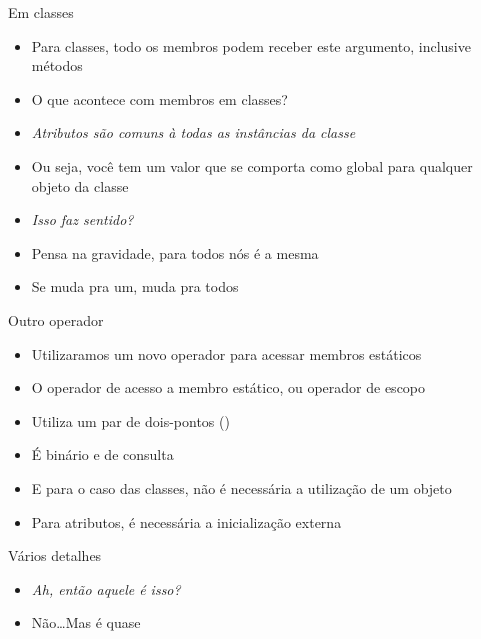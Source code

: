 \documentclass[14pt]{beamer}
\begin{document}
		\begin{frame}{Em classes}
			\begin{itemize}
				\presentationPause\item Para classes, todo os membros podem receber este argumento, inclusive métodos
				\presentationPause\item O que acontece com membros  em classes?
				\presentationPause\item \textit{Atributos são comuns à todas as instâncias da classe}
				\presentationPause\item Ou seja, você tem um valor que se comporta como global para qualquer objeto da classe
				\presentationPause\item \textit{Isso faz sentido?}
				\presentationPause\item Pensa na gravidade, para todos nós é a mesma
				\presentationPause\item Se muda pra um, muda pra todos
			\end{itemize}
		\end{frame}

		\begin{frame}{Outro operador}
			\begin{itemize}
				\presentationPause\item Utilizaramos um novo operador para acessar membros estáticos
				\presentationPause\item O operador de acesso a membro estático\presentationPause, ou operador de escopo
				\presentationPause\item Utiliza um par de dois-pontos (\basicCode{::})
				\presentationPause\item É binário e de consulta
			\end{itemize}
			\presentationPause
			\begin{itemize}
				\presentationPause\item E para o caso das classes, não é necessária a utilização de um objeto
				\presentationPause\item Para atributos, é necessária a inicialização externa
			\end{itemize}
		\end{frame}

		\begin{frame}{Vários detalhes}
			\presentationPause
			\begin{itemize}
				\presentationPause\item \textit{Ah, então aquele  é isso?}
				\presentationPause\item Não\dots \presentationPause Mas é quase
			\end{itemize}
		\end{frame}
\end{document}
